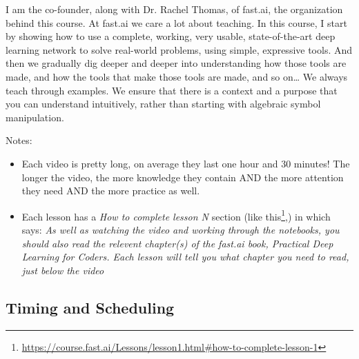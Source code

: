 		I am the co-founder, along with Dr. Rachel Thomas, of fast.ai, the organization behind this course. At fast.ai we care a lot about teaching. In this course, I start by showing how to use a complete, working, very usable, state-of-the-art deep learning network to solve real-world problems, using simple, expressive tools. And then we gradually dig deeper and deeper into understanding how those tools are made, and how the tools that make those tools are made, and so on… We always teach through examples. We ensure that there is a context and a purpose that you can understand intuitively, rather than starting with algebraic symbol manipulation.
		
		\clearpage
		
		\noindent Notes:
		\begin{itemize}
			\item Each video is pretty long, on average they last one hour and 30 minutes! The longer the video, the more knowledge they contain AND the more attention they need AND the more practice as well.
			
			\item Each lesson has a \textit{How to complete lesson N} section (like this\footnote{\url{https://course.fast.ai/Lessons/lesson1.html\#how-to-complete-lesson-1}},) in which says: \textit{As well as watching the video and working through the notebooks, you should also read the relevent chapter(s) of the fast.ai book, Practical Deep Learning for Coders. Each lesson will tell you what chapter you need to read, just below the video}
		\end{itemize}
		
			\subsection{Timing and Scheduling}
				
				
